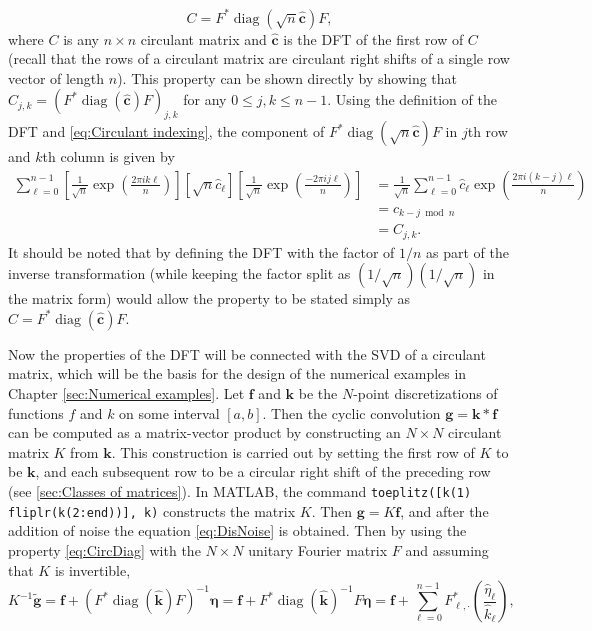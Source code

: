 \documentclass[12pt,notitlepage]{report}
\newcommand{\gVec}{\mathbf{g}}	%
\newcommand{\gnoiseVec}{\widetilde{\mathbf{g}}}	%
\newcommand{\kVec}{\mathbf{k}}	%
\newcommand{\kMat}{K}	%
\newcommand{\fVec}{\mathbf{f}}	%
\newcommand{\ctrans}{*}	%
\DeclareMathOperator{\diag}{diag}	%
\newcommand{\noise}{\eta}	%
\newcommand{\noiseVec}{\bm{\noise}}	%
\begin{document}
\begin{equation}
C = F^\ctrans\diag(\sqrt{n}\widehat{\mathbf{c}})F,
\label{eq:CircDiag}
\end{equation}
where $C$ is any $n \times n$ circulant matrix and $\widehat{\mathbf{c}}$ is the DFT of the first row of $C$ (recall that the rows of a circulant matrix are circulant right shifts of a single row vector of length $n$). This property can be shown directly by showing that $C_{j,k} = (F^\ctrans\diag(\widehat{\mathbf{c}})F)_{j,k}$ for any $0 \leq j,k \leq n-1$. Using the definition of the DFT and \eqref{eq:Circulant indexing}, the component of $F^\ctrans\diag(\sqrt{n}\widehat{\mathbf{c}})F$ in $j$th row and $k$th column is given by
\begin{align*}
\sum_{\ell=0}^{n-1} \left[\frac{1}{\sqrt{n}}  \exp\left(\frac{2\pi{i}k\ell}{n}\right)\right] \left[\sqrt{n}\widehat{c}_\ell\right] \left[\frac{1}{\sqrt{n}} \exp\left(\frac{-2\pi{i}j\ell}{n}\right)\right] &= \frac{1}{\sqrt{n}} \sum_{\ell=0}^{n-1} \widehat{c}_\ell \exp\left(\frac{2\pi{i}(k-j)\ell}{n}\right) \\
&= c_{k-j \bmod n} \\
&= C_{j,k}.
\end{align*}
It should be noted that by defining the DFT with the factor of $1/n$ as part of the inverse transformation (while keeping the factor split as $(1/\sqrt{n})(1/\sqrt{n})$ in the matrix form) would allow the property to be stated simply as $C = F^\ctrans\diag(\widehat{\mathbf{c}})F$. \par 
Now the properties of the DFT will be connected with the SVD of a circulant matrix, which will be the basis for the design of the numerical examples in Chapter \ref{sec:Numerical examples}. Let $\fVec$ and $\kVec$ be the $N$-point discretizations of functions $f$ and $k$ on some interval $[a,b]$. Then the cyclic convolution $\gVec = \kVec * \fVec$ can be computed as a matrix-vector product by constructing an $N \times N$ circulant matrix $\kMat$ from $\kVec$. This construction is carried out by setting the first row of $\kMat$ to be $\kVec$, and each subsequent row to be a circular right shift of the preceding row (see \ref{sec:Classes of matrices}). In MATLAB, the command \texttt{toeplitz([k(1) fliplr(k(2:end))], k)} constructs the matrix $\kMat$. Then $\gVec = \kMat\fVec$, and after the addition of noise the equation \eqref{eq:DisNoise} is obtained. Then by using the property \eqref{eq:CircDiag} with the $N \times N$ unitary Fourier matrix $F$ and assuming that $\kMat$ is invertible, 
\begin{equation}
\kMat^{-1}\gnoiseVec = \fVec + (F^\ctrans\diag(\widehat{\kVec})F)^{-1}\noiseVec = \fVec + F^\ctrans\diag(\widehat{\kVec})^{-1}F\noiseVec = \fVec + \sum_{\ell = 0}^{n-1} F^\ctrans_{\ell,\cdot}\left(\frac{\widehat{\noise}_\ell}{\widehat{k}_\ell}\right),
\label{eq:InvProdDFT}
\end{equation}
\end{document}
